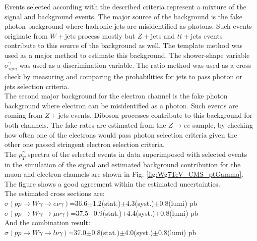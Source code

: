 
Events selected according with the described criteria represent a mixture of the signal and background events. The major source of the background is the fake photon background where hadronic jets are misidentified as photons. Such events originate from $W+$jets process mostly but $Z+$jets and $\bar{t}t+$jets events contribute to this source of the background as well. The template method was used as a major method to estimate this background. The shower-shape variable $\sigma_{i\eta i\eta}^{\gamma}$ was used as a discrimination variable. The ratio method was used as a cross check by measuring and comparing the probabilities for jets to pass photon or jets selection criteria. \\

The second major background for the electron channel is the fake photon background where electron can be misidentified as a photon. Such events are coming from $Z+$jets events. Diboson processes contribute to this background for both channels. The fake rates are estimated from the $Z\rightarrow ee$ sample, by checking how often one of the electrons would pass photon selection criteria given the other one passed stringent electron selection criteria.\\


The $p_T^\gamma$ spectra of the selected events in data superimposed with selected events in the simulation of the signal and estimated background contribution for the muon and electron channels are shown in Fig. \ref{fig:Wg7TeV_CMS_ptGamma}. The figure shows a good agreement within the estimated uncertainties.\\

The estimated cross sections are:\\
$\sigma(pp\rightarrow W\gamma \rightarrow e\nu\gamma)$=36.6$\pm$1.2(stat.)$\pm$4.3(syst.)$\pm$0.8(lumi) pb\\
$\sigma(pp\rightarrow W\gamma \rightarrow \mu\nu\gamma)$=37.5$\pm$0.9(stat.)$\pm$4.4(syst.)$\pm$0.8(lumi) pb\\
And the combination result:\\
$\sigma(pp\rightarrow W\gamma \rightarrow l\nu\gamma)$=37.0$\pm$0.8(stat.)$\pm$4.0(syst.)$\pm$0.8(lumi) pb\\


